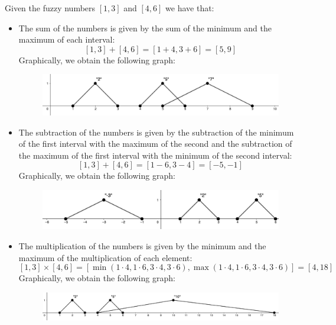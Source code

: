 \documentclass[12pt, a4paper]{report}
\theoremstyle{remark}
\begin{document}
    \begin{example}
        Given the fuzzy numbers $[1,3]$ and $[4,6]$ we have that:
        \begin{itemize}
            \item The sum of the numbers is given by the sum of the minimum and the maximum of each interval:
                \[[1,3]+[4,6]=[1+4,3+6]=[5,9]\]
                Graphically, we obtain the following graph:
                \begin{figure}[H]
                    \centering
                    \includegraphics[width=0.75\linewidth]{images/sum.png}
                \end{figure}
            \item The subtraction of the numbers is given by the subtraction of the minimum of the first interval with the maximum of the 
            second and the subtraction of the maximum of the first interval with the minimum of the second interval:
                \[[1,3]+[4,6]=[1-6,3-4]=[-5,-1]\]
                Graphically, we obtain the following graph:
                \begin{figure}[H]
                    \centering
                    \includegraphics[width=0.75\linewidth]{images/subtraction.png}
                \end{figure}
            \item The multiplication of the numbers is given by the minimum and the maximum of the multiplication of each element:
                \[[1,3] \times [4,6]=[\min(1 \cdot 4, 1 \cdot 6, 3 \cdot 4, 3 \cdot 6),\max(1 \cdot 4, 1 \cdot 6, 3 \cdot 4, 3 \cdot 6)]=[4,18]\]                Graphically, we obtain the following graph:
                \begin{figure}[H]
                    \centering
                    \includegraphics[width=0.75\linewidth]{images/multiplication.png}
                \end{figure}

\end{itemize}
\end{example}
\end{document}
